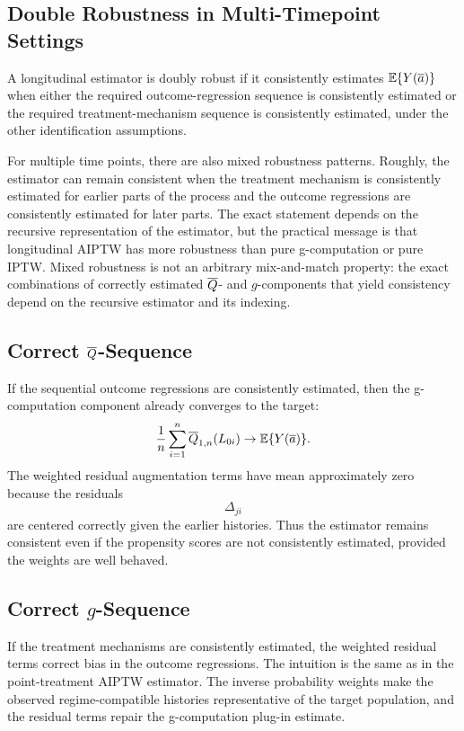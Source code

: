 \subsection{Double Robustness in Multi-Timepoint Settings}

\begin{definition}
A longitudinal estimator is doubly robust if it consistently estimates
$\mathbb{E}\{Y(\overline{a})\}$ when either the required outcome-regression sequence is
consistently estimated or the required treatment-mechanism sequence is
consistently estimated, under the other identification assumptions.
\end{definition}

For multiple time points, there are also mixed robustness patterns. Roughly, the
estimator can remain consistent when the treatment mechanism is consistently
estimated for earlier parts of the process and the outcome regressions are
consistently estimated for later parts. The exact statement depends on the
recursive representation of the estimator, but the practical message is that
longitudinal AIPTW has more robustness than pure g-computation or pure IPTW.
Mixed robustness is not an arbitrary mix-and-match property: the exact
combinations of correctly estimated $\overline{Q}$- and $g$-components that yield
consistency depend on the recursive estimator and its indexing.

\subsection{Correct $\overline{Q}$-Sequence}

If the sequential outcome regressions are consistently estimated, then the
g-computation component already converges to the target:
\[
  \frac{1}{n}\sum_{i=1}^n\overline{Q}_{1,n}(L_{0i})
  \rightarrow \mathbb{E}\{Y(\overline{a})\}.
\]
The weighted residual augmentation terms have mean approximately zero because
the residuals
\[
  \Delta_{ji}
\]
are centered correctly given the earlier histories. Thus the estimator remains
consistent even if the propensity scores are not consistently estimated, provided
the weights are well behaved.

\subsection{Correct $g$-Sequence}

If the treatment mechanisms are consistently estimated, the weighted residual
terms correct bias in the outcome regressions. The intuition is the same as in
the point-treatment AIPTW estimator. The inverse probability weights make the
observed regime-compatible histories representative of the target population,
and the residual terms repair the g-computation plug-in estimate.


